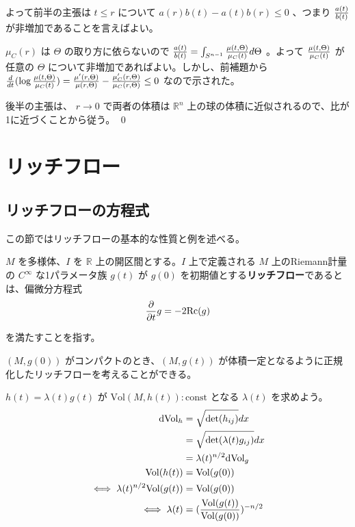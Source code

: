 \documentclass[dvipdfmx,a4paper]{jsreport}
\theoremstyle{definition}
\newcommand{\der}{\partial}
\newcommand{\Vol}{{\rm Vol}}
\newcommand{\dVol}{{\rm dVol}}
\newcommand{\R}{\mathbb{R}}
\begin{document}
よって前半の主張は $t \leq r$ について $a(r)b(t)-a(t)b(r) \leq 0$ 、つまり ${a(t) \over b(t)}$ が非増加であることを言えばよい。

$\mu_C(r)$ は $\Theta$ の取り方に依らないので ${a(t) \over b(t)}=\int_{S^{n-1}} {\mu(t,\Theta) \over \mu_C(t)}d\Theta$ 。よって ${\mu(t,\Theta) \over \mu_C(t)}$ が任意の $\Theta$ について非増加であればよい。しかし、前補題から ${d \over dt}(\log {\mu(t,\Theta) \over \mu_C(t)}) ={\mu'(r,\Theta) \over \mu(r,\Theta)}-{\mu_C'(r,\Theta) \over \mu_C(r,\Theta)} \leq 0$ なので示された。

後半の主張は、 $r \to 0$ で両者の体積は $\R^n$ 上の球の体積に近似されるので、比が1に近づくことから従う。 \qed 





\newpage

\chapter{リッチフロー}

\section{リッチフローの方程式}

この節ではリッチフローの基本的な性質と例を述べる。

 $M$ を多様体、$I$ を $\R$ 上の開区間とする。$I$ 上で定義される $M$ 上のRiemann計量の $C^\infty$ な1パラメータ族 $g(t)$ が $g(0)$ を初期値とする\textbf{リッチフロー}であるとは、偏微分方程式
\begin{align*}
    {\der \over \der t}g=-2\mbox{Rc}(g)
\end{align*}

を満たすことを指す。

$(M,g(0))$ がコンパクトのとき、$(M,g(t))$ が体積一定となるように正規化したリッチフローを考えることができる。

$h(t)=\lambda(t)g(t)$ が $\mbox{Vol}(M,h(t)):\mbox{const}$ となる $\lambda(t)$ を求めよう。
\begin{align*}
    \dVol_h &= \sqrt{\det(h_{ij})}dx \\
    &= \sqrt{\det(\lambda(t)g_{ij})}dx \\
    &= \lambda(t)^{n/2}\dVol_g \\
    \Vol(h(t)) &= \Vol(g(0)) \\
    \iff \lambda(t)^{n/2}\Vol(g(t)) &= \Vol(g(0)) \\
    \iff \lambda(t) &= ({\Vol(g(t)) \over \Vol(g(0))})^{-n/2}
\end{align*}
\end{document}
